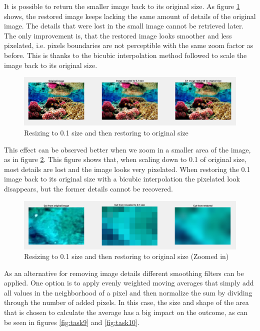 It is possible to return the smaller image back to its original size. As figure \ref{fig:task7} shows, the restored image keeps lacking the same amount of details of the original image. The details that were lost in the small image cannot be retrieved later. The only improvement is, that the restored image looks smoother and less pixelated, i.e. pixels boundaries are not perceptible with the same zoom factor as before. This is thanks to the bicubic interpolation method followed to scale the image back to its original size.

\begin{figure}[!hbt]
  \includegraphics[width=\textwidth]{./img/task7.png}
  \caption{Resizing to 0.1 size and then restoring to original size}
  \label{fig:task7}
\end{figure}

This effect can be observed better when we zoom in a smaller area of the image, as in figure \ref{fig:task8}. This figure shows that, when scaling down to 0.1 of original size, most details are lost and the image looks very pixelated. When restoring the 0.1 image back to its original size with a bicubic interpolation the pixelated look disappears, but the former details cannot be recovered.

\begin{figure}[!hbt]
  \includegraphics[width=\textwidth]{./img/task8.png}
  \caption{Resizing to 0.1 size and then restoring to original size (Zoomed in)}
  \label{fig:task8}
\end{figure}

As an alternative for removing image details different smoothing filters can be applied. One option is to apply evenly weighted moving averages that simply add all values in the neighborhood of a pixel and then normalize the sum by dividing through the number of added pixels. In this case, the size and shape of the area that is chosen to calculate the average has a big impact on the outcome, as can be seen in figures \ref{fig:task9} and \ref{fig:task10}.

